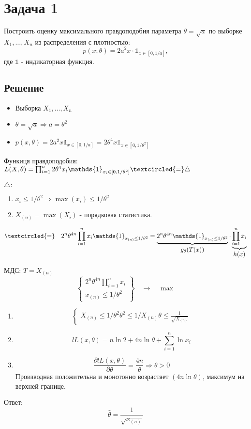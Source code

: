 \documentclass[areasetadvanced]{scrartcl}
\begin{document}
\newpage
\section{Задача 1} 
Построить оценку максимального правдоподобия параметра $\theta = \sqrt{a}$ по выборке $X_1, \dots, X_n$ из распределения с плотностью:
\[
p(x;\theta) = 2a^{2}x \cdot \mathds{1}_{x \in [0, 1/a]},
\]
где $\mathds{1}$ - индикаторная функция.
\subsection{Решение}
\begin{itemize}
	\item Выборка $X_1, \dots, X_n$
	\item $\theta = \sqrt{a} \Longrightarrow a = \theta^2$
	\item $p(x, \theta) = 2a^{2}x\mathds{1}_{x\in[0,1/a]}$ = $2\theta^{4}x\mathds{1}_{x \in [0,1/\theta^{2}]}$ 
\end{itemize}
Функиця правдоподобия:
$L(X,\theta) = \prod_{i=1}^{n} 2 \theta^{4} x_i \mathds{1}_{x_i\in[0,1/\theta^2]} \textcircled{=} \triangle$ 


$\triangle:$
\begin{enumerate}
	\item $x_i \leq 1/\theta^2 \Longrightarrow \max(x_i) \leq 1/\theta^2$
	\item $X_{(n)} = \max(X_i)$ - порядковая статистика.
\end{enumerate}
\[
\textcircled{=} \quad
2^n \theta^{4n}\prod_{i=1}^{n}x_i \mathds{1}_{x_{(n)}\leq1/\theta^2} 
= 
\underbrace{2^n \theta^{4n} \mathds{1}_{x_{(n)}\leq 1/\theta^2}}_{\textstyle g_\theta(T(x))} 
\cdot 
\underbrace{\prod_{i=1}^{n}x_i}_{\textstyle h(x)}
\]

МДС: $T=X_{(n)}$
\[
\left\{
\begin{array}{l}
2^n \theta^{4n} \prod_{i=1}^{n} x_i \\
x_{(n)} \leq 1/\theta^2
\end{array}
\right\}
\quad
\rightarrow
\quad
\max
\]
\begin{enumerate}
	\item \[ \begin{cases}
		X_{(n)} \leq 1/\theta^2
		\theta^2 \leq 1/X_{(n)} 
		\theta \leq \frac{1}{\sqrt{X_{(n)}}}
	\end{cases} 
	\]
	\item \[ lL(x, \theta) = n\ln2 + 4n\ln\theta + \sum_{i=1}^{n}\ln{x_i} \]
	\item \[
		\frac{\partial{lL(x,\theta)}}{\partial{\theta}} = \frac{4n}{\theta}
		\Longrightarrow \theta > 0
		\]
		\subitem Производная положительна и монотонно возрастает \( (4n \ln{\theta}) \), максимум на верхней границе.
		
		
\end{enumerate}
Ответ: \[ \hat{\theta} = \frac{1}{\sqrt{x_{(n)}}}\]
\newpage
\end{document}
